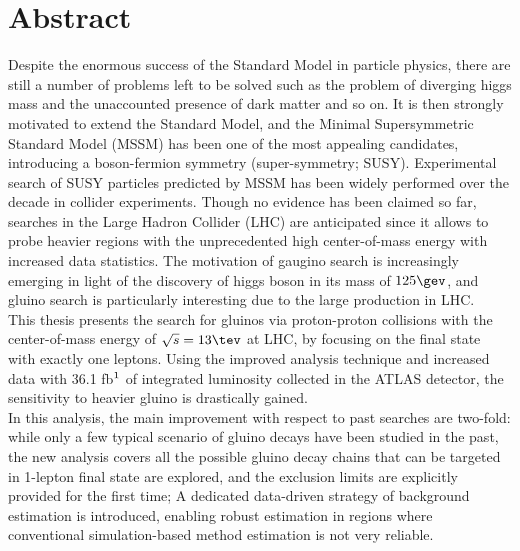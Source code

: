 \setlength{\topmargin}{-1.5cm}
\setlength{\oddsidemargin}{-0.3cm}
\setlength{\evensidemargin}{-0.3cm}
\setlength{\textwidth}{16.5cm}
\setlength{\textheight}{23cm}



%

\section*{Abstract} 
Despite the enormous success of the Standard Model in particle physics, there are still a number of problems left to be solved such as the problem of diverging higgs mass and the unaccounted presence of dark matter and so on.
It is then strongly motivated to extend the Standard Model, and the Minimal Supersymmetric Standard Model (MSSM) has been one of the most appealing candidates, introducing a boson-fermion symmetry (super-symmetry; SUSY). 
Experimental search of SUSY particles predicted by MSSM has been widely performed over the decade in collider experiments. Though no evidence has been claimed so far, searches in the Large Hadron Collider (LHC) are anticipated since it allows to probe heavier regions with the unprecedented high center-of-mass energy with increased data statistics.
The motivation of gaugino search is increasingly emerging in light of the discovery of higgs boson in its mass of $125\gev$, and gluino search is particularly interesting due to the large production in LHC.   \\

This thesis presents the search for gluinos via proton-proton collisions with the center-of-mass energy of $\sqrt{s}=13\tev$ at LHC, by focusing on the final state with exactly one leptons. 
Using the improved analysis technique and increased data with 36.1 fb$^{\-1}$ of integrated luminosity collected in the ATLAS detector, the sensitivity to heavier gluino is drastically gained.  \\

In this analysis, the main improvement with respect to past searches are two-fold: 
while only a few typical scenario of gluino decays have been studied in the past, 
the new analysis covers all the possible gluino decay chains that can be targeted in 1-lepton final state are explored, 
and the exclusion limits are explicitly provided for the first time; 
A dedicated data-driven strategy of background estimation is introduced, enabling robust estimation in regions where conventional simulation-based method estimation is not very reliable. \\

